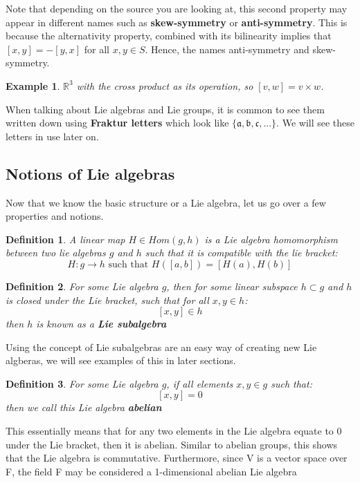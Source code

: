 \documentclass[12pt, letterpaper]{article}
\newcommand{\R}{\mathbb{R}}
\newtheorem*{defn}{Definition}
\newtheorem{ex}[thm]{Example}
\begin{document}
Note that depending on the source you are looking at, this second property may appear in different names such as \textbf{skew-symmetry} or \textbf{anti-symmetry}. This is because the alternativity property, combined with its bilinearity implies that $[x,y] = -[y,x]$ for all $x,y\in S$. Hence, the names anti-symmetry and skew-symmetry.

\begin{ex}
$\R^3$ with the cross product as its operation, so $[v, w] = v \times w$. 
\end{ex}

When talking about Lie algebras and Lie groups, it is common to see them written down using \textbf{Fraktur letters} which look like $\{ \mathfrak{a,b,c,...} \}$. We will see these letters in use later on.

\subsection{Notions of Lie algebras}
Now that we know the basic structure or a Lie algebra, let us go over a few properties and notions.

\begin{defn}
A linear map $H\in Hom(g, h)$ is a Lie algebra homomorphism between two lie algebras $g$ and $h$ such that it is compatible with the lie bracket:
\[ H: g \rightarrow h \text{ such that } H([a,b]) = [H(a),H(b)] \]
\end{defn}

\begin{defn}
For some Lie algebra $g$, then for some linear subspace $h \subset g$ and $h$ is closed under the Lie bracket, such that for all $x, y \in h$:
\[ [x,y] \in h \]
then $h$ is known as a \textbf{Lie subalgebra}
\end{defn}

Using the concept of Lie subalgebras are an easy way of creating new Lie algberas, we will see examples of this in later sections.



\begin{defn}
For some Lie algebra $g$, if all elements $x,y \in g$ such that:
\[ [x,y] = 0 \]
then we call this Lie algebra \textbf{abelian}
\end{defn}

This essentially means that for any two elements in the Lie algebra equate to 0 under the Lie bracket, then it is abelian. Similar to abelian groups, this shows that the Lie algebra is commutative. Furthermore, since V is a vector space over F, the field F may be considered a 1-dimensional abelian Lie algebra
\end{document}
